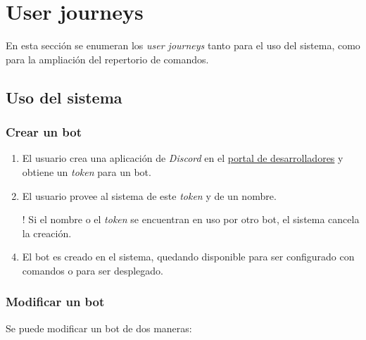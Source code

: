 \section{User journeys}

En esta sección se enumeran los \textit{user journeys} tanto para el uso del sistema, como para la ampliación del repertorio de comandos.

\subsection{Uso del sistema}

\subsubsection{Crear un bot}

\begin{enumerate}
	\item El usuario crea una aplicación de \textit{Discord} en el \href{https://discord.com/developers/applications}{portal de desarrolladores} y obtiene un \textit{token} para un bot.
	\item El usuario provee al sistema de este \textit{token} y de un nombre.
	\item[!] Si el nombre o el \textit{token} se encuentran en uso por otro bot, el sistema cancela la creación.
	\item El bot es creado en el sistema, quedando disponible para ser configurado con comandos o para ser desplegado.
\end{enumerate}

\subsubsection{Modificar un bot}

Se puede modificar un bot de dos maneras:

